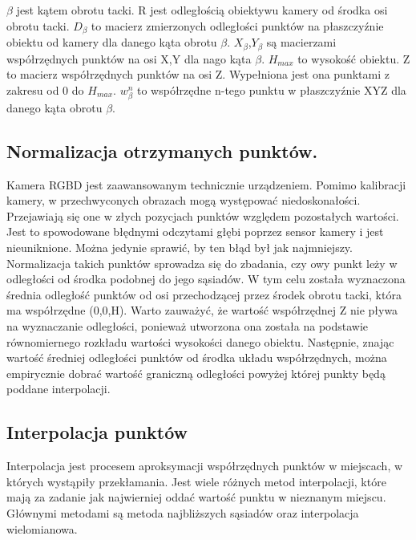 $\beta$ jest kątem obrotu tacki. R jest odległością obiektywu kamery od środka osi obrotu tacki. $D_{\beta}$ to macierz zmierzonych odległości punktów na płaszczyźnie obiektu od kamery dla danego kąta obrotu $\beta$. $X_{\beta}$,$Y_{\beta}$ są macierzami współrzędnych punktów na osi X,Y dla nago kąta $\beta$. $H_{max}$ to wysokość obiektu. Z to macierz współrzędnych punktów na osi Z. Wypełniona jest ona punktami z zakresu od 0 do $H_{max}$. $w_{\beta}^n$ to współrzędne n-tego punktu w płaszczyźnie XYZ dla danego kąta obrotu $\beta$.

\subsection{Normalizacja otrzymanych punktów.}
Kamera RGBD jest zaawansowanym technicznie urządzeniem. Pomimo kalibracji kamery, w przechwyconych obrazach mogą występować niedoskonałości. Przejawiają się one w złych pozycjach punktów względem pozostałych wartości. Jest to spowodowane błędnymi odczytami głębi poprzez sensor kamery i jest nieuniknione. Można jedynie sprawić, by ten błąd był jak najmniejszy. Normalizacja takich punktów sprowadza się do zbadania, czy owy punkt leży w odległości od środka podobnej do jego sąsiadów. W tym celu została wyznaczona średnia odległość punktów od osi przechodzącej przez środek obrotu tacki, która ma współrzędne (0,0,H). Warto zauważyć, że wartość współrzędnej Z nie pływa na wyznaczanie odległości, ponieważ utworzona ona została na podstawie równomiernego rozkładu wartości wysokości danego obiektu. Następnie, znając wartość średniej odległości punktów od środka układu współrzędnych, można empirycznie dobrać wartość graniczną odległości powyżej której punkty będą poddane interpolacji.

\subsection{Interpolacja punktów}
Interpolacja jest procesem aproksymacji współrzędnych punktów w miejscach, w których wystąpiły przekłamania. Jest wiele różnych metod interpolacji, które mają za zadanie jak najwierniej oddać wartość punktu w nieznanym miejscu. Głównymi metodami są metoda najbliższych sąsiadów oraz interpolacja wielomianowa.

